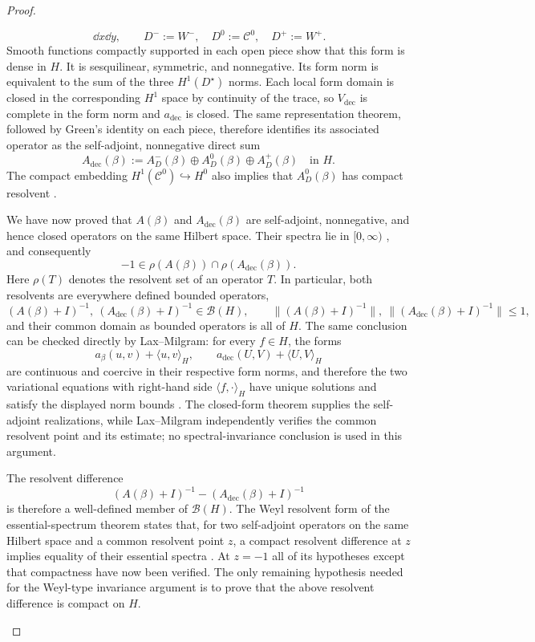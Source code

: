\begin{proof}
\begin{enumerate}[label=\textit{Step \arabic*.},leftmargin=*]
\[      \,\dd x\dd y,
  \qquad
  D^-:=W^-,\quad D^0:=\mathcal C^0,\quad D^+:=W^+.
\]
Smooth functions compactly supported in each open piece show that this form is
dense in $H$.  It is sesquilinear, symmetric, and nonnegative.  Its form norm
is equivalent to the sum of the three $H^1(D^\star)$ norms.  Each local form
domain is closed in the corresponding $H^1$ space by continuity of the trace,
so $V_{\mathrm{dec}}$ is complete in the form norm and
$a_{\mathrm{dec}}$ is closed.  The same representation theorem, followed by
Green's identity on each piece, therefore identifies its associated operator
as the self-adjoint, nonnegative direct sum
\[
  A_{\mathrm{dec}}(\beta)
  :=A_D^-(\beta)\oplus A_D^0(\beta)\oplus A_D^+(\beta)
  \quad\text{in }H.
\]
The compact embedding $H^1(\mathcal C^0)\hookrightarrow H^0$ also implies
that $A_D^0(\beta)$ has compact resolvent
\cite[Chapter~3]{McLean2000}.

We have now proved that $A(\beta)$ and $A_{\mathrm{dec}}(\beta)$ are
self-adjoint, nonnegative, and hence closed operators on the same Hilbert
space.  Their spectra lie in $[0,\infty)$
\cite[Chapter~V]{Kato1995}, and consequently
\[
  -1\in\rho(A(\beta))\cap\rho(A_{\mathrm{dec}}(\beta)).
\]
Here $\rho(T)$ denotes the resolvent set of an operator $T$.
In particular, both resolvents are everywhere defined bounded operators,
\[
  (A(\beta)+I)^{-1},\ (A_{\mathrm{dec}}(\beta)+I)^{-1}
  \in\mathcal B(H),
  \qquad
  \|(A(\beta)+I)^{-1}\|,\
  \|(A_{\mathrm{dec}}(\beta)+I)^{-1}\|\leq1,
\]
and their common domain as bounded operators is all of $H$.  The same
conclusion can be checked directly by Lax--Milgram: for every $f\in H$, the
forms
\[
  a_\beta(u,v)+\langle u,v\rangle_H,
  \qquad
  a_{\mathrm{dec}}(U,V)+\langle U,V\rangle_H
\]
are continuous and coercive in their respective form norms, and therefore the
two variational equations with right-hand side $\langle f,\cdot\rangle_H$
have unique solutions and satisfy the displayed norm bounds
\cite[Lemma~2.32]{McLean2000}.  The closed-form theorem supplies the
self-adjoint realizations, while Lax--Milgram independently verifies the
common resolvent point and its estimate; no spectral-invariance conclusion is
used in this argument.

The resolvent difference
\[
  (A(\beta)+I)^{-1}-(A_{\mathrm{dec}}(\beta)+I)^{-1}
\]
is therefore a well-defined member of $\mathcal B(H)$.  The Weyl resolvent
form of the essential-spectrum theorem states that, for two self-adjoint
operators on the same Hilbert space and a common resolvent point $z$, a
compact resolvent difference at $z$ implies equality of their essential
spectra \cite[Theorem~XIII.14]{ReedSimon1978}.  At $z=-1$ all of its
hypotheses except that compactness have now been verified.  The only remaining
hypothesis needed for the Weyl-type invariance argument is to prove that the
above resolvent difference is compact on $H$.
\end{enumerate}


\end{proof}
